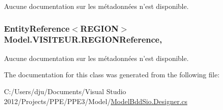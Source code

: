 Aucune documentation sur les métadonnées n'est disponible. 

\hypertarget{class_model_1_1_v_i_s_i_t_e_u_r_ae61f882626334167e06c2ca25f876cc2}{
\subsubsection[{R\-E\-G\-I\-O\-N\-Reference}]{\setlength{\rightskip}{0pt plus 5cm}Entity\-Reference$<${\bf R\-E\-G\-I\-O\-N}$>$ Model.\-V\-I\-S\-I\-T\-E\-U\-R.\-R\-E\-G\-I\-O\-N\-Reference\hspace{0.3cm}{\ttfamily [get]}, {\ttfamily [set]}}}\label{class_model_1_1_v_i_s_i_t_e_u_r_ae61f882626334167e06c2ca25f876cc2}


Aucune documentation sur les métadonnées n'est disponible. 



The documentation for this class was generated from the following file\-:\begin{DoxyCompactItemize}
\item 
C\-:/\-Users/dju/\-Documents/\-Visual Studio 2012/\-Projects/\-P\-P\-E/\-P\-P\-E3/\-Model/\hyperlink{_model_bdd_sio_8_designer_8cs}{Model\-Bdd\-Sio.\-Designer.\-cs}\end{DoxyCompactItemize}
